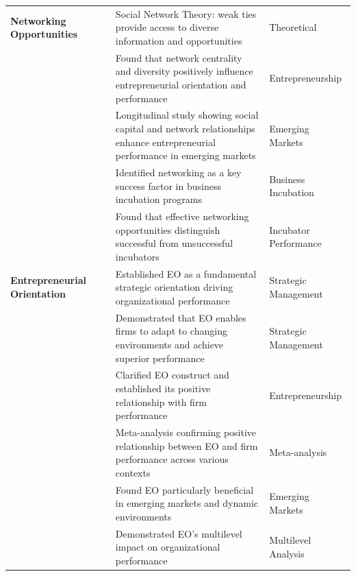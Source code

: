 \documentclass[../Main.tex]{subfiles}
\begin{document}
\begin{longtable}{|p{2.5cm}|p{3cm}|p{6cm}|p{2.5cm}|}
        \textbf{Networking Opportunities} & \autocite{granovetter1973strength} & Social Network Theory: weak ties provide access to diverse information and opportunities & Theoretical \\
        & \autocite{stam2008entrepreneurial} & Found that network centrality and diversity positively influence entrepreneurial orientation and performance & Entrepreneurship \\
        & \autocite{batjargal2003social} & Longitudinal study showing social capital and network relationships enhance entrepreneurial performance in emerging markets & Emerging Markets \\
        & \autocite{theodorakopoulos2014business} & Identified networking as a key success factor in business incubation programs & Business Incubation \\
        & \autocite{harper2018makes} & Found that effective networking opportunities distinguish successful from unsuccessful incubators & Incubator Performance \\
        \hline
        
        \textbf{Entrepreneurial Orientation} & \autocite{miller1983correlates} & Established EO as a fundamental strategic orientation driving organizational performance & Strategic Management \\
        & \autocite{covin1989strategic} & Demonstrated that EO enables firms to adapt to changing environments and achieve superior performance & Strategic Management \\
        & \autocite{lumpkin1996clarifying} & Clarified EO construct and established its positive relationship with firm performance & Entrepreneurship \\
        & \autocite{rauch2009entrepreneurial} & Meta-analysis confirming positive relationship between EO and firm performance across various contexts & Meta-analysis \\
        & \autocite{saeed2014entrepreneurial} & Found EO particularly beneficial in emerging markets and dynamic environments & Emerging Markets \\
        & \autocite{wales2013entrepreneurial} & Demonstrated EO's multilevel impact on organizational performance & Multilevel Analysis \\
        \hline
        

\end{longtable}
\end{document}
